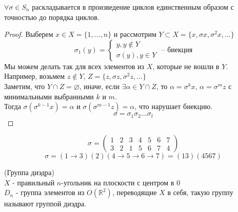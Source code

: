 \begin{stmt}
	$\forall \sigma \in S_n$ раскладывается в произведение циклов единственным образом с точностью до порядка циклов.
	\begin{proof}
		Выберем $x \in X = \{1, \dots, n\}$ и рассмотрим $Y \subset X = \{x, \sigma x, \sigma^2 x, \dots\}$
		\[
		\sigma_1(y) =
		\begin{cases}
			y, y \notin Y \\
			\sigma(y), y \in Y
		\end{cases} \text{ -- биекция}
		\]
		Мы можем делать так для всех элементов из $X$, которые не вошли в $Y$. \\ Например, возьмем $z \notin Y$,
  $Z = \{z, \sigma z, \sigma^2 z, \dots\}$ \\
		Заметим, что $Y \cap Z = \varnothing$, иначе, если $\exists \alpha \in Y \cap Z$, то $\alpha = \sigma^k x$,
  $\alpha = \sigma^m z$ с минимальными выбранными $k$ и $m$. \\
		Тогда $\sigma(\sigma^{k-1}x) = \alpha$ и $\sigma(\sigma^{m-1}z) = \alpha$, что нарушает биекцию.
		\[
		\sigma = \sigma_1 \sigma_2 \dots \sigma_t
		\]
	\end{proof}
\end{stmt}

\begin{example}
	\[
	\sigma = \begin{pmatrix}
		1 & 2 & 3 & 4 & 5 & 6 & 7 \\
		3 & 2 & 1 & 5 & 6 & 7 & 4
	\end{pmatrix}
	\]
	$$\sigma = (1 \to 3) (2) (4 \to 5 \to 6 \to 7) = (13)(4567)$$
\end{example}

\begin{definition}(Группа диэдра) \\
	$X$ - правильный $n$-угольник на плоскости с центром в 0 \\
	$D_n$ - группа элементов из $O\left(\mathbb{R}^2\right)$, переводящие $X$ в себя, такую группу называют группой диэдра.
\end{definition}

